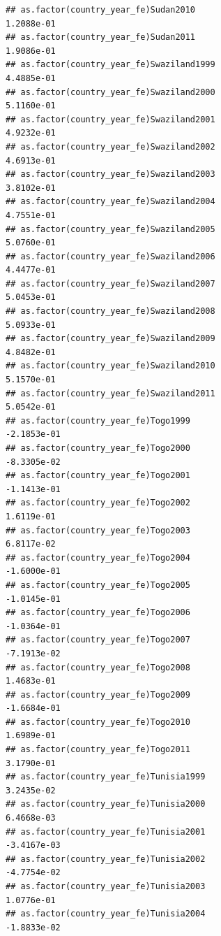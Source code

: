\documentclass[
  a4paper,
]{article}
\begin{document}
\begin{verbatim}
## as.factor(country_year_fe)Sudan2010                             1.2088e-01
## as.factor(country_year_fe)Sudan2011                             1.9086e-01
## as.factor(country_year_fe)Swaziland1999                         4.4885e-01
## as.factor(country_year_fe)Swaziland2000                         5.1160e-01
## as.factor(country_year_fe)Swaziland2001                         4.9232e-01
## as.factor(country_year_fe)Swaziland2002                         4.6913e-01
## as.factor(country_year_fe)Swaziland2003                         3.8102e-01
## as.factor(country_year_fe)Swaziland2004                         4.7551e-01
## as.factor(country_year_fe)Swaziland2005                         5.0760e-01
## as.factor(country_year_fe)Swaziland2006                         4.4477e-01
## as.factor(country_year_fe)Swaziland2007                         5.0453e-01
## as.factor(country_year_fe)Swaziland2008                         5.0933e-01
## as.factor(country_year_fe)Swaziland2009                         4.8482e-01
## as.factor(country_year_fe)Swaziland2010                         5.1570e-01
## as.factor(country_year_fe)Swaziland2011                         5.0542e-01
## as.factor(country_year_fe)Togo1999                             -2.1853e-01
## as.factor(country_year_fe)Togo2000                             -8.3305e-02
## as.factor(country_year_fe)Togo2001                             -1.1413e-01
## as.factor(country_year_fe)Togo2002                              1.6119e-01
## as.factor(country_year_fe)Togo2003                              6.8117e-02
## as.factor(country_year_fe)Togo2004                             -1.6000e-01
## as.factor(country_year_fe)Togo2005                             -1.0145e-01
## as.factor(country_year_fe)Togo2006                             -1.0364e-01
## as.factor(country_year_fe)Togo2007                             -7.1913e-02
## as.factor(country_year_fe)Togo2008                              1.4683e-01
## as.factor(country_year_fe)Togo2009                             -1.6684e-01
## as.factor(country_year_fe)Togo2010                              1.6989e-01
## as.factor(country_year_fe)Togo2011                              3.1790e-01
## as.factor(country_year_fe)Tunisia1999                           3.2435e-02
## as.factor(country_year_fe)Tunisia2000                           6.4668e-03
## as.factor(country_year_fe)Tunisia2001                          -3.4167e-03
## as.factor(country_year_fe)Tunisia2002                          -4.7754e-02
## as.factor(country_year_fe)Tunisia2003                           1.0776e-01
## as.factor(country_year_fe)Tunisia2004                          -1.8833e-02

\end{verbatim}
\end{document}
